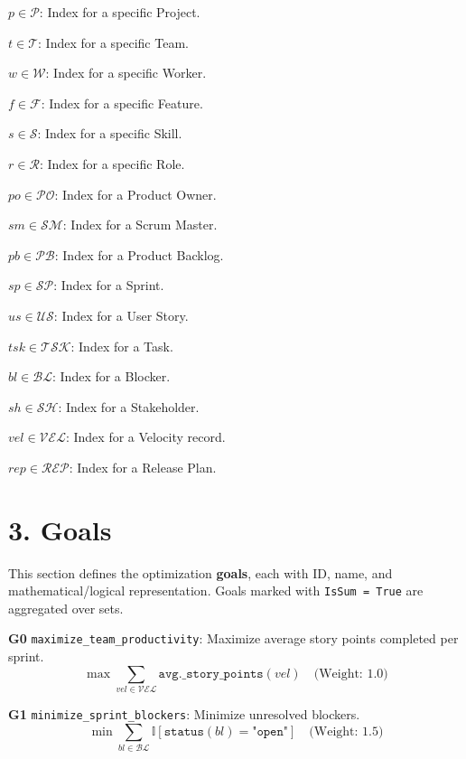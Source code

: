 \documentclass[12pt]{article}
\begin{document}
\item $p \in \mathcal{P}$: Index for a specific Project.
    \item $t \in \mathcal{T}$: Index for a specific Team.
    \item $w \in \mathcal{W}$: Index for a specific Worker.
    \item $f \in \mathcal{F}$: Index for a specific Feature.
    \item $s \in \mathcal{S}$: Index for a specific Skill.
    \item $r \in \mathcal{R}$: Index for a specific Role.
    \item $po \in \mathcal{PO}$: Index for a Product Owner.
    \item $sm \in \mathcal{SM}$: Index for a Scrum Master.
    \item $pb \in \mathcal{PB}$: Index for a Product Backlog.
    \item $sp \in \mathcal{SP}$: Index for a Sprint.
    \item $us \in \mathcal{US}$: Index for a User Story.
    \item $tsk \in \mathcal{TSK}$: Index for a Task.
    \item $bl \in \mathcal{BL}$: Index for a Blocker.
    \item $sh \in \mathcal{SH}$: Index for a Stakeholder.
    \item $vel \in \mathcal{VEL}$: Index for a Velocity record.
    \item $rep \in \mathcal{REP}$: Index for a Release Plan.

\section{3. Goals}

This section defines the optimization \textbf{goals}, each with ID, name, and mathematical/logical representation. Goals marked with \texttt{IsSum = True} are aggregated over sets.

\item[\textbf{G0}] \texttt{maximize\_team\_productivity}: Maximize average story points completed per sprint.
    \[
    \max \sum_{vel \in \mathcal{VEL}} \texttt{avg.\_story\_points}(vel) \quad \text{(Weight: 1.0)}
    \]

    \item[\textbf{G1}] \texttt{minimize\_sprint\_blockers}: Minimize unresolved blockers.
    \[
    \min \sum_{bl \in \mathcal{BL}} \mathbb{I}[\texttt{status}(bl) = \texttt{"open"}] \quad \text{(Weight: 1.5)}
    \]
\end{document}
